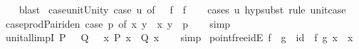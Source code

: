 \begin{isabellebody}
%
\isadelimproof
\ \ %
\endisadelimproof
%
\isatagproof
{}\isamarkupfalse%
\ blast%
\endisatagproof
{\isafoldproof}%
%
\isadelimproof
\isanewline
%
\endisadelimproof
\isanewline
{}\isamarkupfalse%
\ case{\isacharunderscore}{\kern0pt}unit{\isacharunderscore}{\kern0pt}Unity{\isacharcolon}{\kern0pt}\ {\isachardoublequoteopen}{\isacharparenleft}{\kern0pt}case\ u\ of\ {\isacharparenleft}{\kern0pt}{\isacharparenright}{\kern0pt}\ {\isasymRightarrow}\ f{\isacharparenright}{\kern0pt}\ {\isacharequal}{\kern0pt}\ f{\isachardoublequoteclose}\isanewline
%
\isadelimproof
\ \ %
\endisadelimproof
%
\isatagproof
{}\isamarkupfalse%
\ {\isacharparenleft}{\kern0pt}cases\ u{\isacharparenright}{\kern0pt}\ {\isacharparenleft}{\kern0pt}hypsubst{\isacharcomma}{\kern0pt}\ rule\ unit{\isachardot}{\kern0pt}case{\isacharparenright}{\kern0pt}%
\endisatagproof
{\isafoldproof}%
%
\isadelimproof
\isanewline
%
\endisadelimproof
\isanewline
{}\isamarkupfalse%
\ case{\isacharunderscore}{\kern0pt}prod{\isacharunderscore}{\kern0pt}Pair{\isacharunderscore}{\kern0pt}iden{\isacharcolon}{\kern0pt}\ {\isachardoublequoteopen}{\isacharparenleft}{\kern0pt}case\ p\ of\ {\isacharparenleft}{\kern0pt}x{\isacharcomma}{\kern0pt}\ y{\isacharparenright}{\kern0pt}\ {\isasymRightarrow}\ {\isacharparenleft}{\kern0pt}x{\isacharcomma}{\kern0pt}\ y{\isacharparenright}{\kern0pt}{\isacharparenright}{\kern0pt}\ {\isacharequal}{\kern0pt}\ p{\isachardoublequoteclose}\isanewline
%
\isadelimproof
\ \ %
\endisadelimproof
%
\isatagproof
{}\isamarkupfalse%
\ simp%
\endisatagproof
{\isafoldproof}%
%
\isadelimproof
\isanewline
%
\endisadelimproof
\isanewline
{}\isamarkupfalse%
\ unit{\isacharunderscore}{\kern0pt}all{\isacharunderscore}{\kern0pt}impI{\isacharcolon}{\kern0pt}\ {\isachardoublequoteopen}{\isacharparenleft}{\kern0pt}P\ {\isacharparenleft}{\kern0pt}{\isacharparenright}{\kern0pt}\ {\isasymLongrightarrow}\ Q\ {\isacharparenleft}{\kern0pt}{\isacharparenright}{\kern0pt}{\isacharparenright}{\kern0pt}\ {\isasymLongrightarrow}\ {\isasymforall}x{\isachardot}{\kern0pt}\ P\ x\ {\isasymlongrightarrow}\ Q\ x{\isachardoublequoteclose}\isanewline
%
\isadelimproof
\ \ %
\endisadelimproof
%
\isatagproof
{}\isamarkupfalse%
\ simp%
\endisatagproof
{\isafoldproof}%
%
\isadelimproof
\isanewline
%
\endisadelimproof
\isanewline
{}\isamarkupfalse%
\ pointfree{\isacharunderscore}{\kern0pt}idE{\isacharcolon}{\kern0pt}\ {\isachardoublequoteopen}f\ {\isasymcirc}\ g\ {\isacharequal}{\kern0pt}\ id\ {\isasymLongrightarrow}\ f\ {\isacharparenleft}{\kern0pt}g\ x{\isacharparenright}{\kern0pt}\ {\isacharequal}{\kern0pt}\ x{\isachardoublequoteclose}\isanewline

\end{isabellebody}
